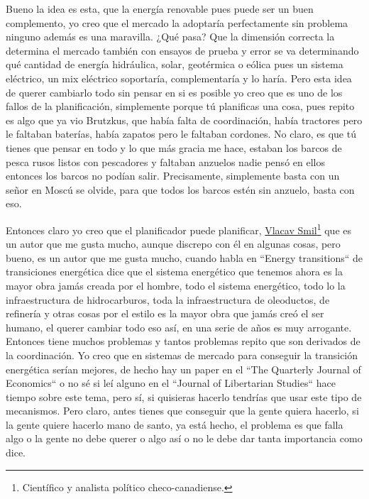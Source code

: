 Bueno la idea es esta, que la energía renovable pues puede ser un buen complemento, yo creo que el mercado la adoptaría perfectamente sin problema ninguno además es una maravilla. ¿Qué pasa? Que la dimensión correcta la determina el mercado también con ensayos de prueba y error se va determinando qué cantidad de energía hidráulica, solar, geotérmica o eólica pues un sistema eléctrico, un mix eléctrico soportaría, complementaría y lo haría. Pero esta idea de querer cambiarlo todo sin pensar en si es posible yo creo que es uno de los fallos de la planificación, simplemente porque tú planificas una cosa, pues repito es algo que ya vio Brutzkus, que había falta de coordinación, había tractores pero le faltaban baterías, había zapatos pero le faltaban cordones. No claro, es que tú tienes que pensar en todo y lo que más gracia me hace, estaban los barcos de pesca rusos listos con pescadores y faltaban anzuelos nadie pensó en ellos entonces los barcos no podían salir. Precisamente, simplemente basta con un señor en Moscú se olvide, para que todos los barcos estén sin anzuelo, basta con eso.

Entonces claro yo creo que el planificador puede planificar, \href{https://en.wikipedia.org/wiki/Vaclav_Smil}{Vlacav Smil}\footnote{Científico y analista político checo-canadiense.} que es un autor que me gusta mucho, aunque discrepo con él en algunas cosas, pero bueno, es un autor que me gusta mucho, cuando habla en ``Energy transitions``\cite{smil2016energy} de transiciones energética dice que el sistema energético que tenemos ahora es la mayor obra jamás creada por el hombre, todo el sistema energético, todo lo la infraestructura de hidrocarburos, toda la infraestructura de oleoductos, de refinería y otras cosas por el estilo es la mayor obra que jamás creó el ser humano, el querer cambiar todo eso así, en una serie de años es muy arrogante. Entonces tiene muchos problemas y tantos problemas repito que son derivados de la coordinación. Yo creo que en sistemas de mercado para conseguir la transición energética serían mejores, de hecho hay un paper en el ``The Quarterly Journal of Economics`` o no sé si leí alguno en el ``Journal of Libertarian Studies`` hace tiempo sobre este tema, pero sí, si quisieras hacerlo tendrías que usar este tipo de mecanismos. Pero claro, antes tienes que conseguir que la gente quiera hacerlo, si la gente quiere hacerlo mano de santo, ya está hecho, el problema es que falla algo o la gente no debe querer o algo así o no le debe dar tanta importancia como dice.


